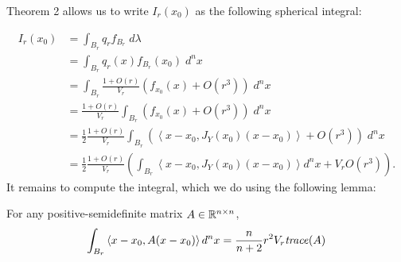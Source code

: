 \documentclass[english]{scrartcl}
\begin{document}
	Theorem 2 allows us to write $I_r(x_0)$ as the following spherical integral: 

	\begin{align*}
		I_r(x_0) &= \int_{B_r} q_r f_{B_r} \; d\lambda \\ 
		&= \int_{B_r} q_r(x) f_{B_r}(x_0)\; d^n x \\
		&= \int_{B_r} \frac{1 + O(r)}{V_r} \left(f_{x_0}(x) + O(r^3)\right) \; d^n x \\
		&= \frac{1 + O(r)}{V_r} \int_{B_r} \left(f_{x_0}(x) + O(r^3)\right) \; d^n x \\
		&= \frac{1}{2}\frac{1 + O(r)}{V_r} \int_{B_r} \left( \left<x - x_0, J_Y(x_0)(x - x_0)\right>  + O(r^3)\right) \; d^n x \\ 
		&= \frac{1}{2}\frac{1 + O(r)}{V_r} \left(\int_{B_r}  \left<x - x_0, J_Y(x_0)(x - x_0)\right> d^n x + V_rO(r^3)\right). 
	\end{align*}
	It remains to compute the integral, which we do using the following lemma: 

	\begin{lm} For any positive-semidefinite matrix $A \in \mathbb{R}^{n\times n}$, 
			$$\int_{B_r} \left< x - x_0, A(x-x_0) \right> d^n x = \frac{n}{n+2} r^{2} V_r \text{\emph{trace}} (A)$$
	\end{lm}
		
\end{document}
